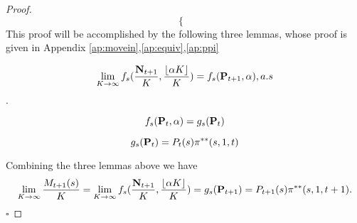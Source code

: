 \begin{proof}{}
\begin{equation}
\begin{cases}
\end{cases}
\end{equation}
This proof will be accomplished by the following three lemmas, whose proof is given in Appendix \ref{ap:movein},\ref{ap:equiv},\ref{ap:ppi}
\begin{lemma}\label{th:movein}
$$\lim_{K\rightarrow\infty}f_s(\frac{\mathbf{N}_{t+1}}{K},\frac{\lfloor\alpha K\rfloor}{K}) = f_s(\mathbf{P}_{t+1},\alpha), a.s$$.
\end{lemma}
\begin{lemma}\label{th:equiv}
$$f_s(\mathbf{P}_t,\alpha) = g_s(\mathbf{P}_t)$$
\end{lemma}
\begin{lemma}\label{th:ppi}
$$g_s(\mathbf{P}_t) = P_t(s)\pi^{**}(s,1,t)$$
\end{lemma}
Combining the three lemmas above we have  $$\lim_{K\rightarrow\infty}\frac{M_{t+1}(s)}{K}=\lim_{K\rightarrow\infty}f_s(\frac{\mathbf{N}_{t+1}}{K},\frac{\lfloor\alpha K\rfloor}{K}) =g_s(\mathbf{P}_{t+1})=P_{t+1}(s)\pi^{**}(s,1,t+1).$$ 
$\square$
\end{proof}

